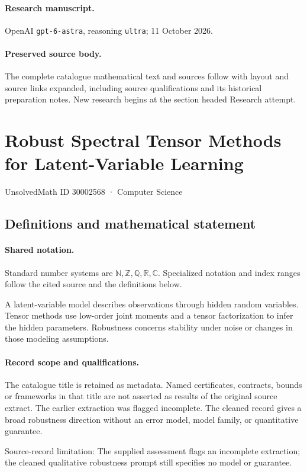 \documentclass[11pt]{article}
\begin{document}
\paragraph{Research manuscript.} OpenAI \texttt{gpt-6-astra}, reasoning \texttt{ultra}; 11 October 2026.
\paragraph{Preserved source body.} The complete catalogue mathematical text and sources follow with layout and source links expanded, including source qualifications and its historical preparation notes. New research begins at the section headed Research attempt.

\section{Robust Spectral Tensor Methods for Latent-Variable Learning}\label{30002568}
{\small UnsolvedMath ID 30002568 · Computer Science}
\subsection{Definitions and mathematical statement}

\paragraph{Shared notation.}Standard number systems are $\mathbb N,\mathbb Z,\mathbb Q,\mathbb R,\mathbb C$. Specialized notation and index ranges follow the cited source and the definitions below.


A latent-variable model describes observations through hidden random variables. Tensor methods use low-order joint moments and a tensor factorization to infer the hidden parameters. Robustness concerns stability under noise or changes in those modeling assumptions.
\paragraph{Record scope and qualifications.}
The catalogue title is retained as metadata. Named certificates, contracts, bounds or frameworks in that title are not asserted as results of the original source extract.
The earlier extraction was flagged incomplete. The cleaned record gives a broad robustness direction without an error model, model family, or quantitative guarantee.

Source-record limitation: The supplied assessment flags an incomplete extraction; the cleaned qualitative robustness prompt still specifies no model or guarantee.
\end{document}
